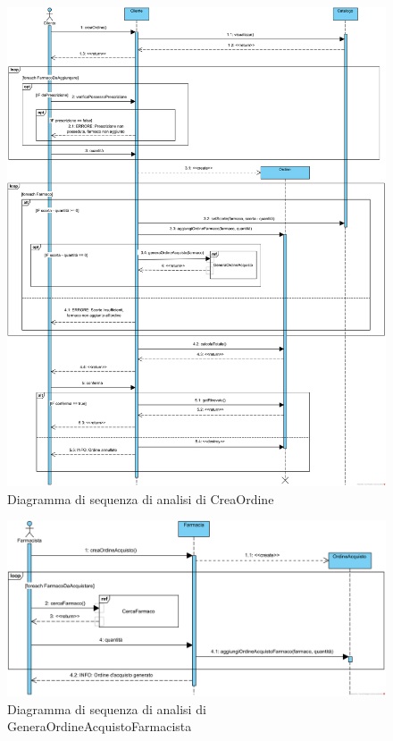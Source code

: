 \begin{figure}[!hbp]
	\centering
	\includegraphics[width=\linewidth]{assets/sequence_analisi/SequenceAnalisiCreaOrdine.png}
	\caption{Diagramma di sequenza di analisi di CreaOrdine}
\end{figure}

\begin{figure}[!ht]
	\centering
	\includegraphics[width=\linewidth]{assets/sequence_analisi/SequenceAnalisiGeneraOrdineAcquistoFarmacista.png}
	\caption{Diagramma di sequenza di analisi di GeneraOrdineAcquistoFarmacista}
\end{figure}

